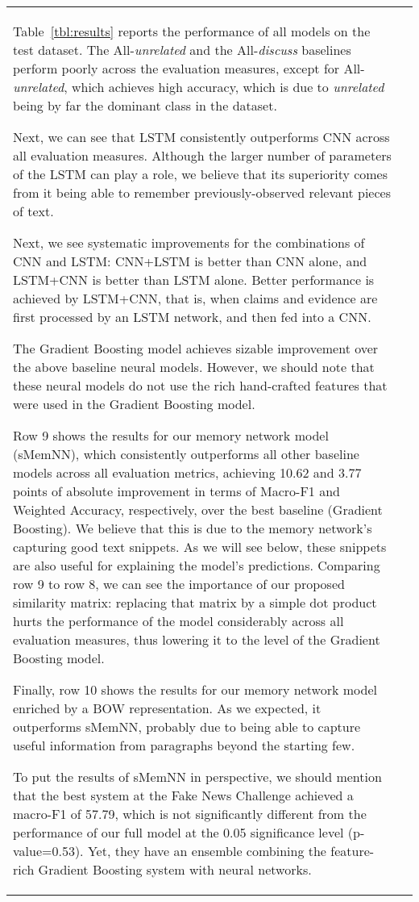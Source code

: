 \documentclass[11pt,a4paper]{article}
\begin{document}
\begin{table}
{\begin{tabularx}{1.15\linewidth}{|lX|}
Table~\ref{tbl:results} reports the performance of all models on the test dataset. 
The All-\emph{unrelated} and the All-\emph{discuss} baselines perform poorly across the evaluation measures, except for All-\emph{unrelated}, which achieves high accuracy, which is due to \emph{unrelated} being by far the dominant class in the dataset. 

Next, we can see that LSTM consistently outperforms CNN across all evaluation measures. 
Although the larger number of parameters of the LSTM can play a role, we believe that its superiority comes from it being able to remember previously-observed relevant pieces of text.

Next, we see systematic improvements for the combinations of CNN and LSTM: CNN+LSTM is better than CNN alone, and LSTM+CNN is better than LSTM alone. Better performance is achieved by LSTM+CNN, that is, when claims and evidence are first processed by an LSTM network, and then fed into a CNN.

The Gradient Boosting model 
achieves sizable improvement over the above baseline neural models. However, we should note that these neural models do not use the rich hand-crafted features that were used in the Gradient Boosting model.


\noindent Row 9 shows the results for our memory network model (sMemNN), which consistently outperforms all other baseline models across all evaluation metrics, achieving 10.62 and 3.77 points of absolute improvement in terms of Macro-F1 and Weighted Accuracy, respectively, over the best baseline (Gradient Boosting). 
We believe that this is due to the memory network's capturing good text snippets. As we will see below, these snippets are also useful for explaining the model's predictions. 
Comparing row 9 to row 8, we can see the importance of our proposed similarity matrix: replacing that matrix by a simple dot product hurts the performance of the model considerably across all evaluation measures, thus lowering it to the level of the Gradient Boosting model.

Finally, row 10 shows the results for our memory network model enriched by a BOW representation. As we expected, it outperforms sMemNN, probably due to being able to capture useful information from paragraphs beyond the starting few.

To put the results of sMemNN in perspective, we should mention that the best system at the Fake News Challenge achieved a macro-F1 of 57.79, which is not significantly different from the performance of our full model at the 0.05 significance level (p-value=0.53). Yet, they have an ensemble combining the feature-rich Gradient Boosting system with neural networks. 


\end{tabularx}}
\end{table}
\end{document}
